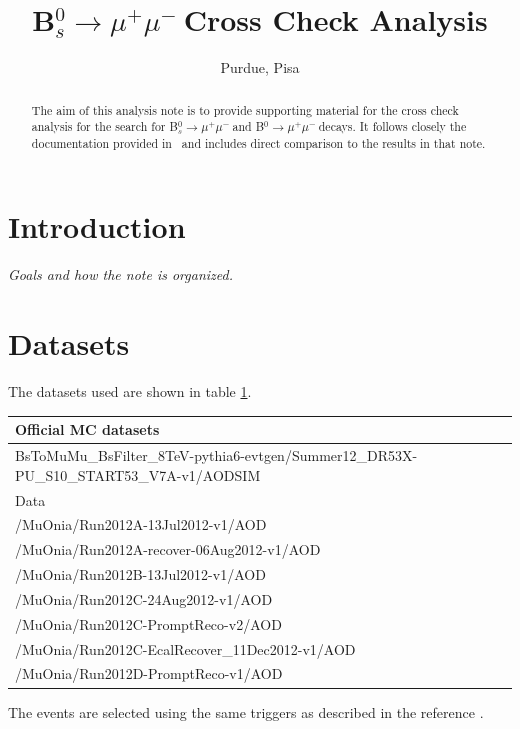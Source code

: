\documentclass[10pt,a4paper]{article}
\author{Purdue, Pisa}
\newcommand{\BsMuMu}{B$^{0}_{s}\rightarrow \mu^+\mu^-\ $}
\newcommand{\BMuMu}{B$^{0}\rightarrow \mu^+\mu^-\ $}
\begin{document}
\title{\BsMuMu Cross Check Analysis}
\maketitle

\begin{abstract}
The aim of this analysis note is to provide supporting material for the cross check analysis for the
search for \BsMuMu and \BMuMu decays. It follows closely the documentation provided in~\cite{MainAN}
and includes direct comparison to the results in that note.
\end{abstract}

\newpage
\tableofcontents
\newpage

\section{Introduction}

\emph{Goals and how the note is organized.}


\section{Datasets}

The datasets used are shown in table \ref{tab:datasets}.
\begin{table}
\begin{tabular}{|l|}
\hline
Official MC datasets \\
\hline
BsToMuMu\_BsFilter\_8TeV-pythia6-evtgen/Summer12\_DR53X-PU\_S10\_START53\_V7A-v1/AODSIM \\
\hline
Data \\
/MuOnia/Run2012A-13Jul2012-v1/AOD \\
/MuOnia/Run2012A-recover-06Aug2012-v1/AOD \\
/MuOnia/Run2012B-13Jul2012-v1/AOD \\
/MuOnia/Run2012C-24Aug2012-v1/AOD \\
/MuOnia/Run2012C-PromptReco-v2/AOD \\
/MuOnia/Run2012C-EcalRecover\_11Dec2012-v1/AOD \\
/MuOnia/Run2012D-PromptReco-v1/AOD \\
\hline
\end{tabular}
\label{tab:datasets}
\end{table}

The events are selected using the same triggers as described in the reference \cite{MainAN}.
\end{document}

